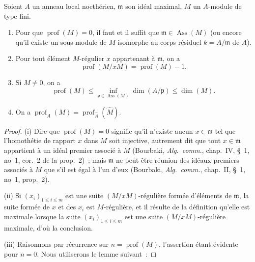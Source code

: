 \begin{proposition}[16.4.6]
Soient $A$ un anneau local noethérien, $\mathfrak{m}$ son idéal maximal, $M$ un
$A$-module de type fini.
\begin{enumerate}
  \item[\rm{(i)}] Pour que $\operatorname{prof}(M)=0$, il faut et il suffit que
  $\mathfrak{m}\in\operatorname{Ass}(M)$ (ou encore qu'il existe un sous-module
  de $M$ isomorphe au corps résiduel $k=A/\mathfrak{m}$ de $A$).
  \item[\rm{(ii)}] Pour tout élément $M$-régulier $x$ appartenant à
  $\mathfrak{m}$, on a
  \begin{equation}
  \label{0.16.4.6.1-fr}
  \tag{16.4.6.1}
    \operatorname{prof}(M/xM)=\operatorname{prof}(M)-1.
  \end{equation}
  \item[\rm{(iii)}] Si $M\neq0$, on a
  \begin{equation}
  \label{0.16.4.6.2-fr}
  \tag{16.4.6.2}
    \operatorname{prof}(M)
    \leq\inf_{\mathfrak{p}\in\operatorname{Ass}(M)}\dim(A/\mathfrak{p})
    \leq\dim(M).
  \end{equation}
  \item[\rm{(iv)}] On a
  $\operatorname{prof}_A(M)=
  \operatorname{prof}_{\widehat{A}}(\widehat{M})$.
\end{enumerate}
\end{proposition}

\begin{proof}
(i) Dire que $\operatorname{prof}(M)=0$ signifie qu'il n'existe aucun
$x\in\mathfrak{m}$ tel que l'homothétie de rapport $x$ dans $M$ soit
injective, autrement dit que tout $x\in\mathfrak{m}$ appartient à un idéal
premier associé à $M$ (Bourbaki, \emph{Alg.~comm.}, chap.~IV, \S~1, no~1,
cor.~2 de la prop.~2)~; mais $\mathfrak{m}$ ne peut être réunion des idéaux
premiers associés à $M$ que s'il est égal à l'un d'eux (Bourbaki,
\emph{Alg.~comm.}, chap.~II, \S~1, no~1, prop.~2).

(ii) Si $(x_i)_{1\leq i\leq m}$ est une suite $(M/xM)$-régulière formée
d'éléments de $\mathfrak{m}$, la suite formée de $x$ et des $x_i$ est
$M$-régulière, et il résulte de la définition qu'elle est maximale lorsque la
suite $(x_i)_{1\leq i\leq m}$ est une suite $(M/xM)$-régulière maximale, d'où
la conclusion.

(iii) Raisonnons par récurrence sur $n=\operatorname{prof}(M)$, l'assertion
étant évidente pour $n=0$. Nous utiliserons le lemme suivant~:
\end{proof}

